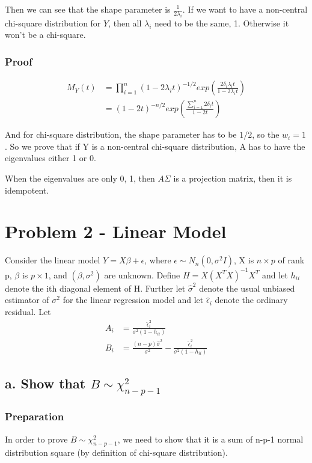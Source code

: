 \documentclass[11pt]{article} %
\begin{document}
Then we can see that the shape parameter is $\frac{1}{2 \lambda_i}$. If we want to have a non-central chi-square distribution for $Y$, then all $\lambda_i$ need to be the same, 1. Otherwise it won't be a chi-square. 

\subsubsection{Proof}

\begin{align*}
	M_Y(t) &= \prod_{i=1}^n  (1-2 \lambda_i t)^{-1/2} exp \left( \frac{ 2 \delta_i \lambda_i t }{1-2 \lambda_i t} \right) \\
	&= (1-2 t)^{-n/2} exp \left( \frac{ \sum_{i=1}^n 2 \delta_i t }{1-2  t} \right) 
\end{align*}

And for chi-square distribution, the shape parameter has to be $1/2$, so the $w_i = 1$. So we prove that if Y is a non-central chi-square distribution, A has to have the eigenvalues either 1 or 0. 

When the eigenvalues are only 0, 1, then $A\Sigma$ is a projection matrix, then it is idempotent.


\section{Problem 2 - Linear Model}
Consider the linear model $Y = X \beta + \epsilon$, where $\epsilon \sim N_n(0, \sigma^2 I)$, X is $n \times p$ of rank p, $\beta$ is $p \times 1$, and $(\beta, \sigma^2)$ are unknown. Define $H = X(X^TX)^{-1}X^T$ and let $h_{ii}$ denote the ith diagonal element of H. Further let $\hat{\sigma}^2$ denote the usual unbiased estimator of $\sigma^2$ for the linear regression model and let $\hat{\epsilon}_i$ denote the ordinary residual. Let 
\begin{align*}
	A_i & = \frac{\hat{\epsilon}_i^2}{\sigma^2(1-h_{ii})} \\
	B_i & = \frac{(n-p)\hat{\sigma}^2 }{\sigma^2} - \frac{\hat{\epsilon}_i^2}{\sigma^2(1-h_{ii})}
\end{align*}

\subsection{a. Show that $B \sim \chi^2_{n-p-1}$}

\subsubsection{Preparation}
In order to prove $B \sim \chi^2_{n-p-1}$, we need to show that it is a sum of n-p-1 normal distribution square (by definition of chi-square distribution). 
\end{document}
